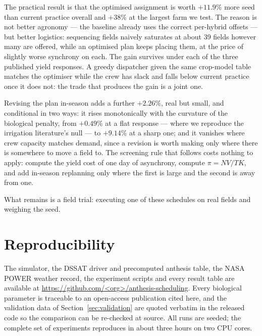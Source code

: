 \documentclass[10pt,twocolumn]{article}
\begin{document}
The practical result is that the optimised assignment is worth
$+11.9$\% more seed than current practice overall and
$+38$\% at the largest farm we test. The reason is not
better agronomy --- the baseline already uses the correct per-hybrid
offsets --- but better logistics: sequencing fields naively saturates
at about 39 fields however many are offered, while an
optimised plan keeps placing them, at the price of slightly worse
synchrony on each. The gain survives under each of the three published
yield responses. A greedy dispatcher given the same crop-model table
matches the optimiser while the crew has slack and falls below current
practice once it does not: the trade that produces the gain is a joint
one.

Revising the plan in-season adds a further $+2.26$\%,
real but small, and conditional in two ways: it rises monotonically
with the curvature of the biological penalty, from $+0.49$\%
at a flat response --- where we reproduce the irrigation literature's
null --- to $+9.14$\% at a sharp one; and it vanishes
where crew capacity matches demand, since a revision is worth making
only where there is somewhere to move a field to. The screening rule
that follows costs nothing to apply: compute the yield cost of one day
of asynchrony, compute $\pi = NV/TK$, and add in-season replanning
only where the first is large and the second is away from one.

What remains is a field trial: executing one of these schedules on
real fields and weighing the seed.

\section{Reproducibility}
The simulator, the DSSAT driver and precomputed anthesis table, the NASA
POWER weather record, the experiment scripts and every result table are
available at \url{https://github.com/<org>/anthesis-scheduling}. Every biological parameter is traceable to
an open-access publication cited here, and the validation data of
Section~\ref{sec:validation} are quoted verbatim in the released code so
the comparison can be re-checked at source. All runs are seeded; the
complete set of experiments reproduces in about three hours on two
CPU cores.
\end{document}
